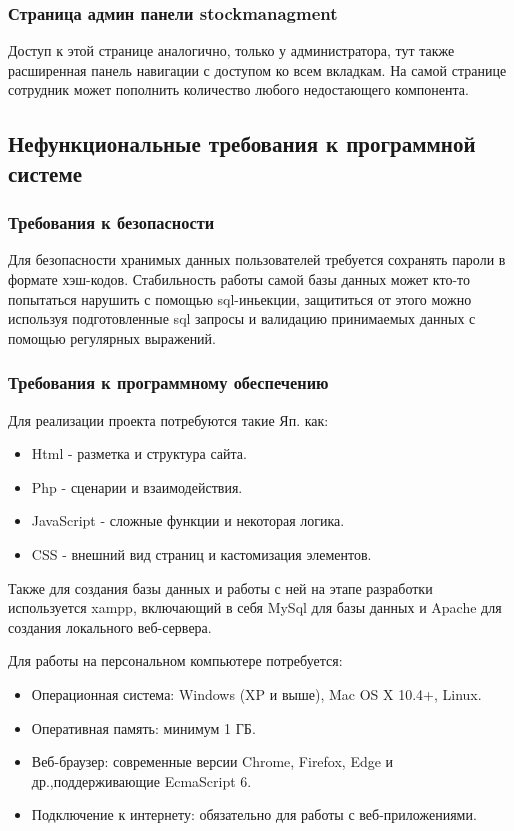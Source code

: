 \subsubsection{Страница админ панели stockmanagment}

Доступ к этой странице аналогично, только у администратора, тут также расширенная панель навигации с доступом ко всем вкладкам. На самой странице сотрудник может пополнить количество любого недостающего компонента.

\subsection{Нефункциональные требования к программной системе}

\subsubsection{Требования к безопасности}
Для безопасности хранимых данных пользователей требуется сохранять пароли в формате  хэш-кодов. Стабильность работы самой базы данных может кто-то попытаться нарушить с помощью sql-иньекции, защититься от этого можно используя подготовленные sql запросы и валидацию принимаемых данных с помощью регулярных выражений.
\subsubsection{Требования к программному обеспечению}
Для реализации проекта потребуются такие Яп. как:
\begin{itemize}
	\item Html - разметка и структура сайта.
	\item Php - сценарии и взаимодействия.
	\item JavaScript - сложные функции и некоторая логика.	
	\item CSS - внешний вид страниц и кастомизация элементов.		
\end{itemize}

Также для создания базы данных и работы с ней на этапе разработки используется xampp, включающий в себя MySql для базы данных и Apache для создания локального веб-сервера. 

Для работы на персональном компьютере потребуется:
\begin{itemize}
	\item Операционная система: Windows (XP и выше), Mac OS X 10.4+, Linux.
	\item Оперативная память: минимум 1 ГБ.
	\item Веб-браузер: современные версии Chrome, Firefox, Edge и др.,поддерживающие EcmaScript 6.	
	\item Подключение к интернету: обязательно для работы с веб-приложениями.		
\end{itemize}

